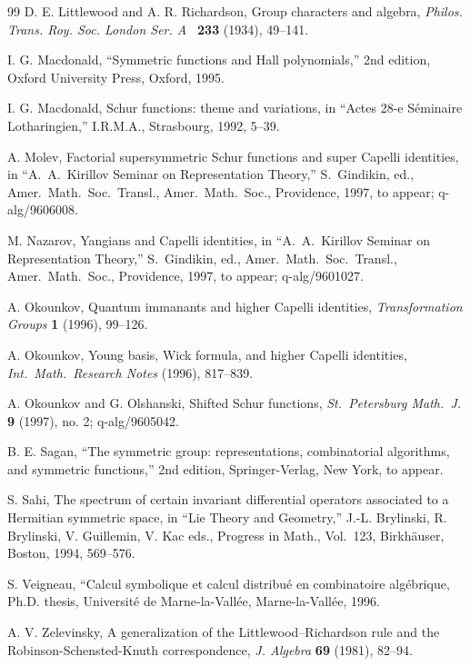 \documentclass[titlepage,12pt]{article}
\newcommand{\bib}{thebibliography}
\newcommand{\0}{{\bf 0}}
\newcommand{\1}{{\bf 1}}
\newcommand{\2}{{\bf 2}}
\newcommand{\3}{{\bf 3}}
\newcommand{\4}{{\bf 4}}
\newcommand{\5}{{\bf 5}}
\newcommand{\6}{{\bf 6}}
\newcommand{\7}{{\bf 7}}
\newcommand{\8}{{\bf 8}}
\newcommand{\9}{{\bf 9}}
\newcommand{\oup}{Oxford University Press}
\begin{document}
\begin{\bib}{99}
 D. E. Littlewood and A. R. Richardson,
Group characters and algebra, {\it Philos. Trans. Roy. Soc. London
Ser. A\ } {\bf 233} (1934), 49--141. 


 I. G. Macdonald,  ``Symmetric  functions 
and Hall polynomials,'' 2nd edition, \oup, Oxford, 1995.


 I. G. Macdonald,  Schur functions: theme and
variations,  in ``Actes 28-e S\'eminaire Lotharingien,''
I.R.M.A., Strasbourg, 1992, 5--39.

 A. Molev, Factorial supersymmetric Schur functions
and
super Capelli identities, in ``A.~A.~Kirillov Seminar on
Representation Theory,'' S.~Gindikin, ed., Amer.\ Math.\ Soc.\
Transl.,  Amer.\ Math.\ Soc., Providence, 1997, to appear; q-alg/9606008.

 M. Nazarov, Yangians and Capelli identities,
in ``A.~A.~Kirillov Seminar on Representation Theory,''
S.~Gindikin, ed., Amer.\ Math.\ Soc.\ Transl., Amer.\ Math.\
Soc., Providence, 1997, to appear; q-alg/9601027.

 A. Okounkov, Quantum immanants and higher
Capelli identities, {\it Transformation Groups} {\bf 1} (1996), 99--126.

\bibitem[O2]{oko:ybw} A. Okounkov, Young basis, Wick formula, and
higher Capelli identities, {\it Int.\ Math.\ Research Notes} (1996),
817--839.

 A. Okounkov and G. Olshanski, Shifted Schur functions,
{\it St.\ Petersburg Math.\ J.} {\bf 9} (1997), no. 2; q-alg/9605042.


 B. E. Sagan, ``The symmetric group: representations,
combinatorial algorithms, and symmetric functions,'' 2nd edition,
Springer-Verlag, New York, to appear.


 S. Sahi, The spectrum of certain invariant
differential
operators associated to a Hermitian symmetric space, in
``Lie Theory and Geometry,'' J.-L. Brylinski, R. Brylinski,
V. Guillemin, V. Kac eds., Progress in Math., Vol.\ 123, Birkh\"auser,
Boston, 1994, 569--576.

 S. Veigneau, ``Calcul symbolique et calcul
distribu\'e en combinatoire al\-g\'e\-brique, Ph.D. thesis,
Universit\'e de Marne-la-Vall\'ee, Marne-la-Vall\'ee, 1996.

 A. V. Zelevinsky, A generalization of the
Littlewood--Richardson rule and the Robinson-Schensted-Knuth 
correspondence, {\it J. Algebra} {\bf 69} (1981), 82--94.

\end{\bib}
\end{document}

